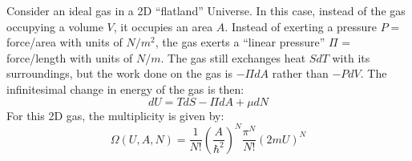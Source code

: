 \question Consider an ideal gas in a 2D ``flatland'' Universe. In this case, instead of the gas occupying a volume $V$, it occupies an area $A$. Instead of exerting a pressure $P=$ force/area with units of $N/m^2$, the gas exerts a ``linear pressure'' $\Pi$ = force/length with units of $N/m$. The gas still exchanges heat $SdT$ with its surroundings, but the work done on the gas is $-\Pi dA$ rather than $-PdV$. The infinitesimal change in energy of the gas is then:
\begin{equation*}
	dU=TdS-\Pi dA +\mu dN
\end{equation*}
For this 2D gas, the multiplicity is given by:
\begin{equation*}
	\Omega(U,A,N)=\frac{1}{N!}\left(\frac{A}{\hbar^2}\right)^N\frac{\pi^N}{N!}\left(2mU\right)^N
\end{equation*}
